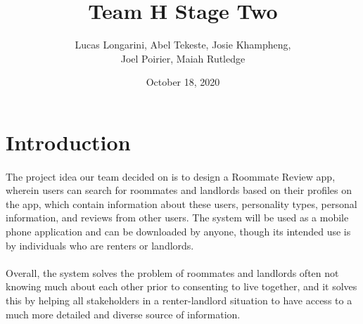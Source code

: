 \documentclass{article}
\title{Team H Stage Two}
\author{Lucas Longarini, Abel Tekeste, Josie Khampheng, \\
Joel Poirier, Maiah Rutledge}
\date{October 18, 2020}
\begin{document}
\maketitle

\section{Introduction}
\paragraph{} The project idea our team decided on is to design a Roommate Review app, wherein
users can search for roommates and landlords based on their profiles on the app, which contain 
information about these users, personality types, personal information, and reviews from other 
users. The system will be used as a mobile phone application and can be downloaded by anyone, 
though its intended use is by individuals who are renters or landlords. 
\medskip
\paragraph{} Overall, the system solves the problem of roommates and landlords often not knowing 
much about each other prior to consenting to live together, and it solves this by helping all 
stakeholders in a renter-landlord situation to have access to a much more detailed and diverse 
source of information.
\medskip
\newline
\end{document}
